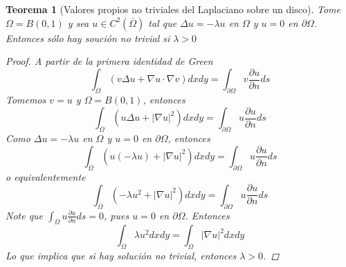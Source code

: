 \documentclass[11pt]{book}
\theoremstyle{plain}
\newtheorem{teo}[proposición]{Teorema}
\theoremstyle{definition}
\begin{document}
    \begin{teo}[Valores propios no triviales del Laplaciano sobre un disco]
        Tome $\Omega = B(0,1)$ y sea $u \in C^{2}(\overline{\Omega})$ tal que $\Delta u = -\lambda u$ en $\Omega$ y $u = 0$ en $\partial \Omega$. Entonces sólo hay soución no trivial si $\lambda > 0$
        \begin{proof}
            A partir de la primera identidad de Green
            \[
                \int_{\overline{\Omega}} \left(v \Delta u + \nabla u \cdot \nabla v\right)dxdy = \int_{\partial \Omega} v \frac{\partial u}{\partial n}ds
            \]
            Tomemos $v = u$ y $\Omega = B(0,1)$, entonces
            \[
                \int_{\overline{\Omega}} \left(u \Delta u + |\nabla u|^{2}\right)dxdy = \int_{\partial \Omega} u \frac{\partial u}{\partial n}ds
            \]
            Como $\Delta u = -\lambda u$ en $\Omega$ y $u = 0$ en $\partial \Omega$, entonces
            \[
                \int_{\overline{\Omega}} \left(u (-\lambda u) + |\nabla u|^{2}\right)dxdy = \int_{\partial \Omega} u \frac{\partial u}{\partial n}ds
            \]
            o equivalentemente
            \[
                \int_{\overline{\Omega}} \left(-\lambda u^{2} + |\nabla u|^{2}\right)dxdy = \int_{\partial \Omega} u \frac{\partial u}{\partial n}ds
            \]
            Note que $\int_{\overline{\Omega}} u\frac{\partial u}{\partial n}ds = 0$, pues $u = 0$ en $\partial \Omega$. Entonces
            \[
                \int_{\overline{\Omega}} \lambda u^{2}dxdy = \int_{\overline{\Omega}} |\nabla u|^{2}dxdy
            \]
            Lo que implica que si hay solución no trivial, entonces $\lambda > 0$.
        \end{proof}
    \end{teo}
\end{document}
